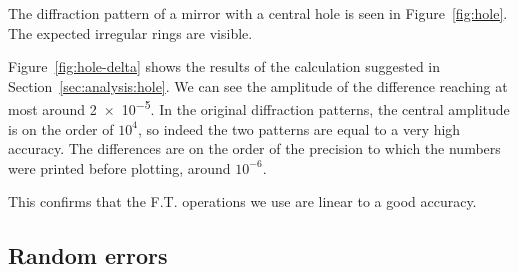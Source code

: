 \documentclass{article}
\begin{document}
The diffraction pattern of a mirror with a central hole is seen in Figure~\ref{fig:hole}. The expected irregular rings are visible.

Figure~\ref{fig:hole-delta} shows the results of the calculation suggested in Section~\ref{sec:analysis:hole}. We can see the amplitude of the difference reaching at most around \num{2e-5}. In the original diffraction patterns, the central amplitude is on the order of $10^4$, so indeed the two patterns are equal to a very high accuracy. The differences are on the order of the precision to which the numbers were printed before plotting, around $10^{-6}$.

This confirms that the F.T. operations we use are linear to a good accuracy.

\subsection{Random errors}\label{sec:res:rand}
\end{document}
